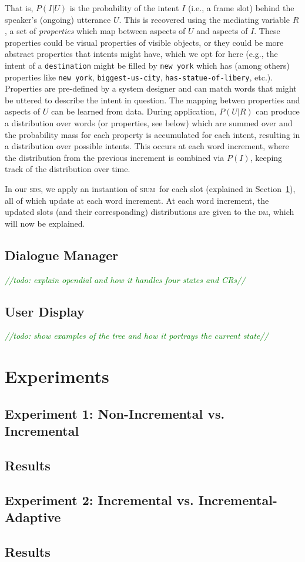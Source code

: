 \documentclass[11pt]{article}
\newcommand{\todo}[1]{\textcolor{green}{\emph{//todo: #1//}}}
\newcommand{\sds}[0]{\textsc{sds}}
\newcommand{\sium}[0]{\textsc{sium}}
\newcommand{\dm}[0]{\textsc{dm}}
\begin{document}
That is, $P(I|U)$ is the probability of the intent $I$ (i.e., a frame slot) behind the speaker's (ongoing) utterance $U$. This is recovered using the mediating variable $R$, a set of \emph{properties} which map between aspects of $U$ and aspects of $I$. These properties could be visual properties of visible objects, or they could be more abstract properties that intents might have, which we opt for here (e.g., the intent of a \texttt{destination} might be filled by \texttt{new york} which has (among others) properties like \texttt{new york}, \texttt{biggest-us-city}, \texttt{has-statue-of-libery}, etc.). Properties are pre-defined by a system designer and can match words that might be uttered to describe the intent in question. The mapping betwen properties and aspects of $U$ can be learned from data. During application, $P(U|R)$ can produce a distribution over words (or properties, see below) which are summed over and the probability mass for each property is accumulated for each intent, resulting in a distribution over possible intents. This occurs at each word increment, where the distribution from the previous increment is combined via $P(I)$, keeping track of the distribution over time. 

In our \sds, we apply an instantion of \sium\ for each slot (explained in Section~\ref{section:experiments}), all of which update at each word increment. At each word increment, the updated slots (and their corresponding) distributions are given to the \dm, which will now be explained. 

\subsection{Dialogue Manager}

\todo{explain opendial and how it handles four states and CRs}

\subsection{User Display}

\todo{show examples of the tree and how it portrays the current state}

\section{Experiments}
\label{section:experiments}

\subsection{Experiment 1: Non-Incremental vs. Incremental}
\label{section:exp1}

\subsection{Results}

\subsection{Experiment 2: Incremental vs. Incremental-Adaptive}
\label{section:exp2}

\subsection{Results}



\end{document}
